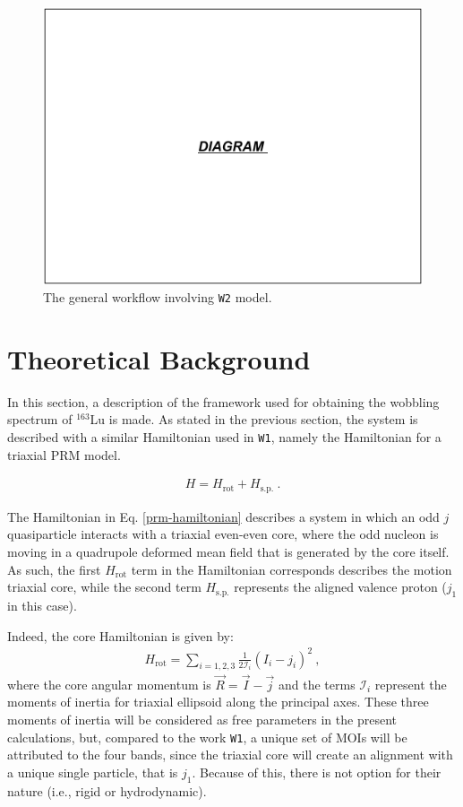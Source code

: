 \documentclass[11pt]{article}
\begin{document}
\begin{figure}
    \centering
    \includegraphics[scale=0.65]{figs/W1_W2_models.pdf}
    \caption{The general workflow involving \texttt{W2} model.}
    \label{w2-model-worfklow}
\end{figure}

\section{Theoretical Background}

In this section, a description of the framework used for obtaining the wobbling spectrum of $^{163}$Lu is made. As stated in the previous section, the system is described with a similar Hamiltonian used in \texttt{W1}, namely the Hamiltonian for a triaxial PRM model.

\begin{align}
    H=H_\text{rot}+H_\text{s.p.}\ .
    \label{prm-hamiltonian}
\end{align}

The Hamiltonian in Eq. \ref{prm-hamiltonian} describes a system in which an odd $j$ quasiparticle interacts with a triaxial even-even core, where the odd nucleon is moving in a quadrupole deformed mean field that is generated by the core itself. As such, the first $H_\text{rot}$ term in the Hamiltonian corresponds describes the motion triaxial core, while the second term $H_\text{s.p.}$ represents the aligned valence proton ($j_1$ in this case).

Indeed, the core Hamiltonian is given by:
\begin{align}
    H_\text{rot}=\sum_{i=1,2,3}\frac{1}{2\mathcal{I}_i}(I_i-j_i)^2\ ,
    \label{core-hamiltonian}
\end{align}
where the core angular momentum is $\vec{R}=\vec{I}-\vec{j}$ and the terms $\mathcal{I}_i$ represent the moments of inertia for triaxial ellipsoid along the principal axes. These three moments of inertia will be considered as free parameters in the present calculations, but, compared to the work \texttt{W1}, a unique set of MOIs will be attributed to the four bands, since the triaxial core will create an alignment with a unique single particle, that is $j_1$. Because of this, there is not option for their nature (i.e., rigid or hydrodynamic).
\end{document}
